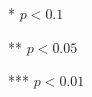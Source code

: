 \begin{table}[h]
\begin{center}
{\begin{minipage}{\textwidth}
*   $ p < 0.1  $

**  $ p < 0.05 $

*** $ p < 0.01 $
\end{minipage}}
\end{center}
\label{tab:Discretionary}
\end{table}
